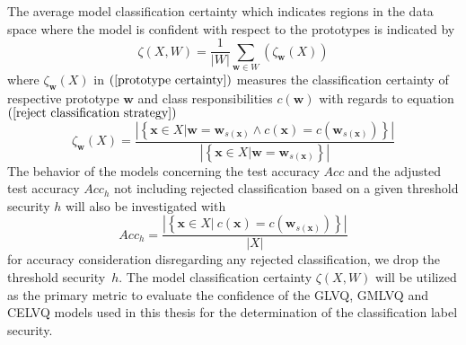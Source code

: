The average model classification certainty which indicates regions in the data space where the model is confident with respect to the prototypes is indicated by  
\begin{equation*}\label{model certainty}
	\zeta(X,W) = \frac{1}{|W|}\sum_{\mathbf{w}\in W}(\zeta_{\mathbf{w}}(X))
\end{equation*}
where $\zeta_{\mathbf{w}}(X)$\hspace{2pt} in $\left( \ref{prototype certainty}\right) $ measures the classification certainty of respective prototype\hspace{2pt} $\mathbf{w}$ and class responsibilities\hspace{2pt} $c \left(\mathbf{w}\right) $ with regards to equation $\left( \ref{reject classification strategy}\right)$  \cite{villmann2018probabilistic} 
\begin{equation}\label{prototype certainty}
	\zeta_{\mathbf{w}}(X) = \frac{|\left\{\mathbf{x}\in X|\mathbf{w} = \mathbf{w}_{s(\mathbf{x})}\wedge c(\mathbf{x}) = c(\mathbf{w}_{s(\mathbf{x})})\right\}|}{|\left\{\mathbf{x}\in X|\mathbf{w} = \mathbf{w}_{s(\mathbf{x})}\right\}|}
\end{equation}
The behavior of the models concerning the test accuracy \hspace{2pt}$Acc$\hspace{2pt} and the  adjusted test accuracy\hspace{2pt} $Acc_{h} $\hspace{2pt} not including rejected classification based on a given threshold security \hspace{2pt}$h$\hspace{2pt} will also be investigated with
\begin{equation}\label{model accuracy}
	Acc_{h} = \frac{|\left\{\mathbf{x}\in X|\ c(\mathbf{x}) = c(\mathbf{w}_{s(\mathbf{x})})\right\}|}{| X|}
\end{equation}
for accuracy consideration disregarding any rejected classification, we drop the threshold security\hspace{2pt}\ $h$.
The model classification certainty\hspace{2pt} $\zeta(X,W)$\hspace{2pt}  will be utilized as the primary metric to evaluate the confidence of the GLVQ, GMLVQ and CELVQ models used in this thesis for the determination of the classification label security.


